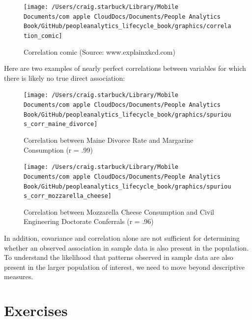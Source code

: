 \documentclass[]{book}
\begin{document}
\begin{figure}

{\centering \texttt{[image: /Users/craig.starbuck/Library/Mobile Documents/com~apple~CloudDocs/Documents/People Analytics Book/GitHub/peopleanalytics\_lifecycle\_book/graphics/correlation\_comic]} 

}

\caption{Correlation comic (Source: www.explainxkcd.com)}\label{fig:corr-comic}
\end{figure}

Here are two examples of nearly perfect correlations between variables for which there is likely no true direct association:

\begin{figure}

{\centering \texttt{[image: /Users/craig.starbuck/Library/Mobile Documents/com~apple~CloudDocs/Documents/People Analytics Book/GitHub/peopleanalytics\_lifecycle\_book/graphics/spurious\_corr\_maine\_divorce]} 

}

\caption{Correlation between Maine Divorce Rate and Margarine Consumption (r = .99)}\label{fig:spur-corr-1}
\end{figure}

\begin{figure}

{\centering \texttt{[image: /Users/craig.starbuck/Library/Mobile Documents/com~apple~CloudDocs/Documents/People Analytics Book/GitHub/peopleanalytics\_lifecycle\_book/graphics/spurious\_corr\_mozzarella\_cheese]} 

}

\caption{Correlation between Mozzarella Cheese Consumption and Civil Engineering Doctorate Conferrals (r = .96)}\label{fig:spur-corr-2}
\end{figure}

In addition, covariance and correlation alone are not sufficient for determining whether an observed association in sample data is also present in the population. To understand the likelihood that patterns observed in sample data are also present in the larger population of interest, we need to move beyond descriptive measures.

\hypertarget{exercises-3}{%
\section{Exercises}\label{exercises-3}}
\end{document}
